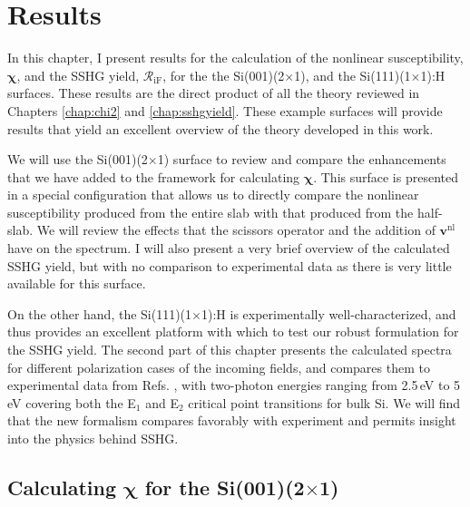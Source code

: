 \chapter{Results}\label{chap:results}
\partialtoc

In this chapter, I present results for the calculation of the nonlinear
susceptibility, $\boldsymbol{\chi}$, and the SSHG yield,
$\mathcal{R}_{\mathrm{iF}}$, for the the Si(001)(2$\times$1), and the
Si(111)(1$\times$1):H surfaces. These results are the direct product of all the
theory reviewed in Chapters \ref{chap:chi2} and \ref{chap:sshgyield}. These
example surfaces will provide results that yield an excellent overview of the
theory developed in this work.

We will use the Si(001)(2$\times$1) surface to review and compare the
enhancements that we have added to the framework for calculating
$\boldsymbol{\chi}$. This surface is presented in a special configuration that
allows us to directly compare the nonlinear susceptibility produced from the
entire slab with that produced from the half-slab. We will review the effects
that the scissors operator and the addition of $\mathbf{v}^{\mathrm{nl}}$ have
on the spectrum. I will also present a very brief overview of the calculated
SSHG yield, but with no comparison to experimental data as there is very little
available for this surface.

On the other hand, the Si(111)(1$\times$1):H is experimentally
well-characterized, and thus provides an excellent platform with which to test
our robust formulation for the SSHG yield. The second part of this chapter
presents the calculated spectra for different polarization cases of the incoming
fields, and compares them to experimental data from Refs. \cite{hoferAPA96,
bergfeldPRL04, mejiaPRB02, mitchellSS01}, with two-photon energies ranging from
2.5\,eV to 5\,eV covering both the E$_{1}$ and E$_{2}$ critical point
transitions for bulk Si. We will find that the new formalism compares favorably
with experiment and permits insight into the physics behind SSHG.



\section{Calculating \texorpdfstring{$\boldsymbol{\chi}$}{X} for the
\texorpdfstring{Si(001)(2$\times$1)}{Si(001)(2x1)}}
\label{sec:res2x1chi}

